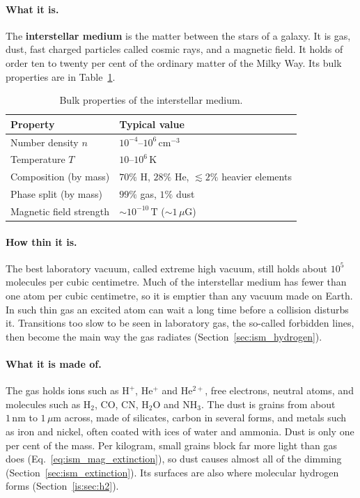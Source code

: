 \paragraph{What it is.} The \textbf{interstellar medium} is the matter between the stars of a galaxy. It is gas, dust, fast charged particles called cosmic rays, and a magnetic field. It holds of order ten to twenty per cent of the ordinary matter of the Milky Way. Its bulk properties are in Table~\ref{tab:ism_bulk_properties}.

\begin{table}[htbp]
	\centering
	\begin{tabular}{@{}l l@{}}
		\toprule
		\textbf{Property} & \textbf{Typical value} \\
		\midrule
		Number density $n$ & $10^{-4} \text{--} 10^{6}\,\mathrm{cm^{-3}}$ \\
		Temperature $T$ & $10\text{--}10^{6}\,\mathrm{K}$ \\
		Composition (by mass) & $70\%$ H, $28\%$ He, $\lesssim 2\%$ heavier elements \\
		Phase split (by mass) & $99\%$ gas, $1\%$ dust \\
		Magnetic field strength & $\sim 10^{-10}\,\mathrm{T}$ ($\sim 1\,\mu\mathrm{G}$) \\
		\bottomrule
	\end{tabular}
	\caption{Bulk properties of the interstellar medium.}
	\label{tab:ism_bulk_properties}
\end{table}

\paragraph{How thin it is.} The best laboratory vacuum, called extreme high vacuum, still holds about $10^{5}$ molecules per cubic centimetre. Much of the interstellar medium has fewer than one atom per cubic centimetre, so it is emptier than any vacuum made on Earth. In such thin gas an excited atom can wait a long time before a collision disturbs it. Transitions too slow to be seen in laboratory gas, the so-called forbidden lines, then become the main way the gas radiates (Section~\ref{sec:ism_hydrogen}).

\paragraph{What it is made of.} The gas holds ions such as $\mathrm{H^+}$, $\mathrm{He^+}$ and $\mathrm{He^{2+}}$, free electrons, neutral atoms, and molecules such as $\mathrm{H_2}$, CO, CN, $\mathrm{H_2O}$ and $\mathrm{NH_3}$. The dust is grains from about $1\,\mathrm{nm}$ to $1\,\mu\mathrm m$ across, made of silicates, carbon in several forms, and metals such as iron and nickel, often coated with ices of water and ammonia. Dust is only one per cent of the mass. Per kilogram, small grains block far more light than gas does (Eq.~\eqref{eq:ism_mag_extinction}), so dust causes almost all of the dimming (Section~\ref{sec:ism_extinction}). Its surfaces are also where molecular hydrogen forms (Section~\ref{is:sec:h2}).

